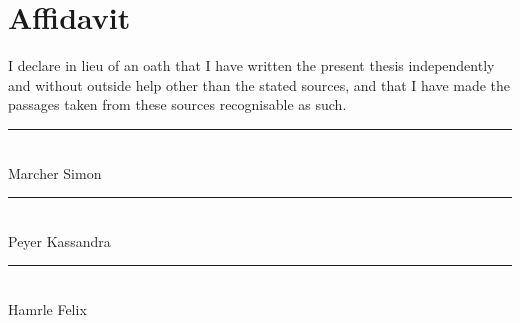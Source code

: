 \chapter*{Affidavit}

I declare in lieu of an oath that I have written the present thesis independently
and without outside help other than the stated sources, and that I have made the
passages taken from these sources recognisable as such.

\vfill

\parbox{\textwidth}{
    \parbox{4cm}{
      \centering
      \rule{4cm}{1pt}\\
       Marcher Simon
    }
    \hfill
    \parbox{4cm}{
      \centering
      \rule{4cm}{1pt}\\
      Peyer Kassandra
    }
    \hfill
    \parbox{4cm}{
      \centering
      \rule{4cm}{1pt}\\
      Hamrle Felix
    }
}
